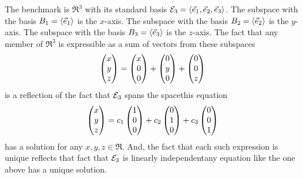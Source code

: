 \begin{example} \label{exam:BenchDirSum}
The benchmark is $\Re^3$ with its standard basis 
${\cal E}_3=\langle\vec{e}_1,\vec{e}_2,\vec{e}_3\rangle$.
The subspace with the basis $B_1=\langle\vec{e}_1\rangle$ is the $x$-axis.
The subspace with the basis $B_2=\langle\vec{e}_2\rangle$ is the $y$-axis.
The subspace with the basis $B_3=\langle\vec{e}_3\rangle$ is the $z$-axis.
The fact that any member of $\Re^3$ is expressible as a sum of vectors from
these subspaces
\begin{equation*}
  \begin{pmatrix} x \\ y \\ z \end{pmatrix}
   =\begin{pmatrix} x \\ 0 \\ 0 \end{pmatrix}
    +\begin{pmatrix} 0 \\ y \\ 0 \end{pmatrix}
    +\begin{pmatrix} 0 \\ 0 \\ z \end{pmatrix}
\end{equation*}
is a reflection of the fact that ${\cal E}_3$ spans the space\Dash this 
equation
\begin{equation*}
  \begin{pmatrix} x \\ y \\ z \end{pmatrix}
   =c_1\begin{pmatrix} 1 \\ 0 \\ 0 \end{pmatrix}
    +c_2\begin{pmatrix} 0 \\ 1 \\ 0 \end{pmatrix}
    +c_3\begin{pmatrix} 0 \\ 0 \\ 1 \end{pmatrix}
\end{equation*}
has a solution for any $x,y,z\in\Re$.
And, the fact that each such expression is unique reflects that fact that
${\cal E}_3$ is linearly independent\Dash any 
equation like the one above has a unique
solution. 
\end{example}

